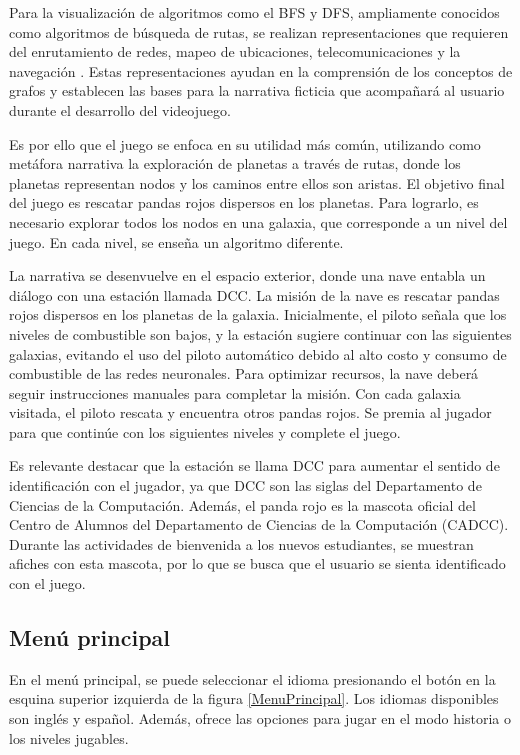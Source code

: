 Para la visualización de algoritmos como el BFS y DFS, ampliamente conocidos como algoritmos de búsqueda de rutas, se realizan representaciones que requieren del enrutamiento de redes, mapeo de ubicaciones, telecomunicaciones y la navegación \cite{surti2023NeoRoute}. Estas representaciones ayudan en la comprensión de los conceptos de grafos y establecen las bases para la narrativa ficticia que acompañará al usuario durante el desarrollo del videojuego.

Es por ello que el juego se enfoca en su utilidad más común, utilizando como metáfora narrativa la exploración de planetas a través de rutas, donde los planetas representan nodos y los caminos entre ellos son aristas. El objetivo final del juego es rescatar pandas rojos dispersos en los planetas. Para lograrlo, es necesario explorar todos los nodos en una galaxia, que corresponde a un nivel del juego. En cada nivel, se enseña un algoritmo diferente.

La narrativa se desenvuelve en el espacio exterior, donde una nave entabla un diálogo con una estación llamada DCC. La misión de la nave es rescatar pandas rojos dispersos en los planetas de la galaxia. Inicialmente, el piloto señala que los niveles de combustible son bajos, y la estación sugiere continuar con las siguientes galaxias, evitando el uso del piloto automático debido al alto costo y consumo de combustible de las redes neuronales. Para optimizar recursos, la nave deberá seguir instrucciones manuales para completar la misión. Con cada galaxia visitada, el piloto rescata y encuentra otros pandas rojos. Se premia al jugador para que continúe con los siguientes niveles y complete el juego.

Es relevante destacar que la estación se llama DCC para aumentar el sentido de identificación con el jugador, ya que DCC son las siglas del Departamento de Ciencias de la Computación. Además, el panda rojo es la mascota oficial del Centro de Alumnos del Departamento de Ciencias de la Computación (CADCC). Durante las actividades de bienvenida a los nuevos estudiantes, se muestran afiches con esta mascota, por lo que se busca que el usuario se sienta identificado con el juego.
 

\subsection{Menú principal}

En el menú principal, se puede seleccionar el idioma presionando el botón en la esquina superior izquierda de la figura \ref{MenuPrincipal}. Los idiomas disponibles son inglés y español. Además, ofrece las opciones para jugar en el modo historia o los niveles jugables.


